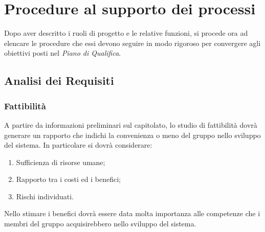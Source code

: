 \section{Procedure al supporto dei processi}{
Dopo aver descritto i ruoli di progetto e le relative funzioni, si procede ora ad elencare le procedure che essi devono seguire in modo rigoroso per convergere agli obiettivi posti nel \textit{Piano di Qualifica}.

	\subsection{Analisi dei Requisiti}{ 
	   \subsubsection{Fattibilità}{
	    		A partire da informazioni preliminari sul capitolato, lo studio di fattibilità dovrà generare un rapporto che indichi la convenienza o meno del gruppo nello sviluppo del sistema. In particolare si dovrà considerare:
	    		\begin{enumerate}
	    			\item Sufficienza di risorse umane;
	    			\item Rapporto tra i costi ed i benefici;
	    			\item Rischi individuati.
	    		\end{enumerate}
	    		Nello stimare i benefici dovrà essere data molta importanza alle competenze che i membri del gruppo acquisirebbero nello sviluppo del sistema.
	    	 }
}}
